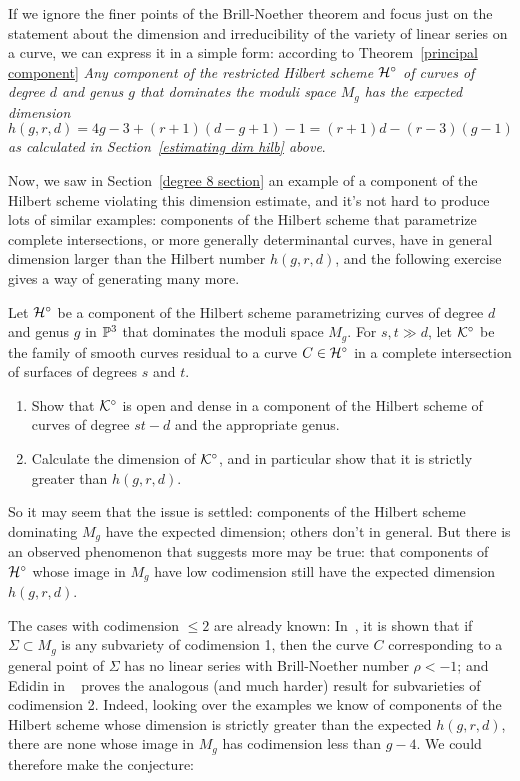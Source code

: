 If we ignore the finer points of the Brill-Noether theorem and focus just on the statement about the dimension and irreducibility of the variety of linear series on a curve, we can express it in a simple form: according to Theorem~\ref{principal component} \emph{Any component of the restricted Hilbert scheme $\cH^\circ$ of curves of degree $d$ and genus $g$ that dominates the moduli space $M_g$ has the expected dimension 
$$
h(g,r,d) = 4g-3 + (r+1)(d-g+1) - 1 = (r+1)d - (r-3)(g-1)
$$
 as calculated in Section~\ref{estimating dim hilb} above}.
 
 
Now, we saw in Section~\ref{degree 8 section} an example of a component of the Hilbert scheme violating this dimension estimate, and it's not hard to produce lots of similar examples: components of the Hilbert scheme that parametrize complete intersections, or more generally determinantal curves, have in general dimension larger than the Hilbert number $h(g,r,d)$, and the following exercise gives a way of generating many more.

\begin{exercise}
Let $\cH^\circ$ be a component of the Hilbert scheme parametrizing curves of degree $d$ and genus $g$ in $\PP^3$ that dominates the moduli space $M_g$. For $s, t \gg d$, let $\cK^\circ$ be the family of smooth curves residual to a curve $C \in  \cH^\circ$ in a complete intersection of surfaces of degrees $s$ and $t$.
\begin{enumerate}
\item Show that $\cK^\circ$ is open and dense in a component of the Hilbert scheme of curves of degree $st-d$ and the appropriate genus.
\item Calculate the dimension of $\cK^\circ$, and in particular show that it is strictly greater than $h(g,r,d)$.
\end{enumerate}
\end{exercise}

So it may seem that the issue is settled: components of the Hilbert scheme dominating $M_g$ have the expected dimension; others don't in general. But there is an observed phenomenon that suggests more may be true: that components of $\cH^\circ$ whose image in $M_g$ have low codimension still have the expected dimension $h(g,r,d)$. 

The cases with codimension $\leq 2$ are already known: In~\cite{BrillNoether-1}, it is shown that if $\Sigma \subset M_g$ is any subvariety of codimension 1, then the curve $C$ corresponding to a general point of $\Sigma$ has no linear series with Brill-Noether number $\rho < -1$; and Edidin in ~\cite{Edidin} proves the analogous (and much harder) result for subvarieties of codimension 2. Indeed, looking over the examples we know of components of the Hilbert scheme whose dimension is strictly greater than the expected $h(g,r,d)$, there are none whose image in $M_g$ has codimension less than $g-4$. We could therefore make the conjecture:

